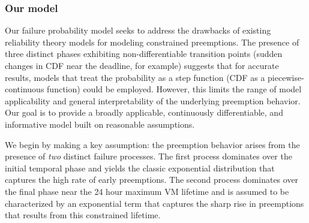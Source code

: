 \vspace*{\subsecspace}
\subsubsection{Our  model}
\label{subsec:preemption-model}



Our failure probability model seeks to address the drawbacks of existing reliability theory models for modeling constrained preemptions. 
The presence of three distinct phases exhibiting non-differentiable transition points (sudden changes in CDF near the deadline, for example) suggests that for accurate results, models that treat the probability as a step function (CDF as a piecewise-continuous function) could be employed.
However, this limits the range of model applicability and general interpretability of the underlying preemption behavior. Our goal is to provide a broadly applicable, continuously differentiable, and informative model built on reasonable assumptions.  


We begin by making a key assumption: the preemption behavior arises from the presence of \emph{two} distinct failure processes.
The first process dominates over the initial temporal phase and yields the classic exponential distribution that captures the high rate of early preemptions.
The second process dominates over the final phase near the 24 hour maximum VM lifetime and is assumed to be characterized by an exponential term that captures the sharp rise in preemptions that results from this constrained lifetime. 

%
%

